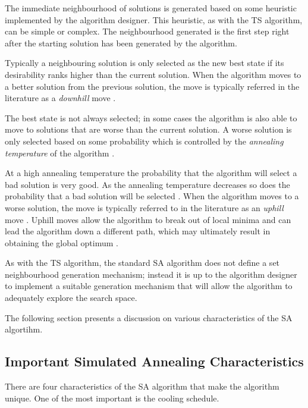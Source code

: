 The immediate neighbourhood of solutions is generated based on some heuristic implemented by the algorithm designer\cite{AIModernApproach}. This heuristic, as with the TS algorithm, can be simple or complex. The neighbourhood generated is the first step right after the starting solution has been generated by the algorithm.

Typically a neighbouring solution is only selected as the new best state if its desirability ranks higher than the current solution. When the algorithm moves to a better solution from the previous solution, the move is typically referred in the literature as a \emph{downhill} move \cite{CurveFittingSA}.

The best state is not always selected; in some cases the algorithm is also able to move to solutions that are worse than the current solution. A worse solution is only selected based on some probability which is controlled by the \emph{annealing temperature} of the algorithm \cite{TheoPraticalSA}. 

At a high annealing temperature the probability that the algorithm will select a bad solution is very good. As the annealing temperature decreases so does the probability that a bad solution will be selected \cite{CurveFittingSA}. When the algorithm moves to a worse solution, the move is typically referred to in the literature as an \emph{uphill} move \cite{CurveFittingSA}. Uphill moves allow the algorithm to break out of local minima and can lead the algorithm down a different path, which may ultimately result in obtaining the global optimum \cite{SASingleMultiObj}. 

As with the TS algorithm, the standard SA algorithm does not define a set neighbourhood generation mechanism; instead it is up to the algorithm designer to implement a suitable generation mechanism that will allow the algorithm to adequately explore the search space\cite{VariousCoolingSA}. 

The following section presents a discussion on various characteristics of the SA algortihm.
\subsection{Important Simulated Annealing Characteristics}
There are four characteristics of the SA algorithm that make the algorithm unique. One of the most important is the cooling schedule. 


